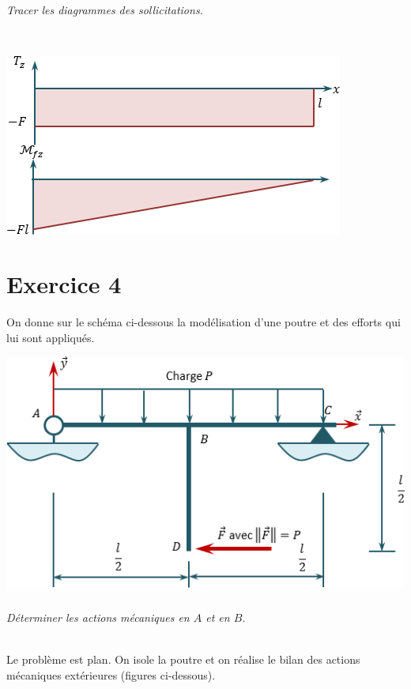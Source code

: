 \documentclass[10pt,fleqn]{article} %
\begin{document}
\begin{multicols}{2}
\begin{corrige}
\end{corrige}
\else
\fi

\subparagraph{}
\textit{Tracer les diagrammes des sollicitations.}
\ifprof
\begin{corrige}~\\

\begin{center}
\includegraphics[width=.6\linewidth]{images/exo_01_01_corr_02}
\end{center}
\end{corrige}
\else
\fi


\section*{Exercice 4}
\setcounter{subparagraph}{0}
On donne sur le schéma ci-dessous la modélisation d'une poutre et des efforts qui lui sont appliqués.
\begin{center}
\includegraphics[width=.45\textwidth]{images/exo_03}
\end{center}

\subparagraph{}
\textit{Déterminer les actions mécaniques en $A$ et en $B$.}
\ifprof
\begin{corrige}~\\

Le problème est plan. On isole la poutre et on réalise le bilan des actions mécaniques extérieures (figures ci-dessous). 


\end{corrige}
\end{multicols}
\end{document}
